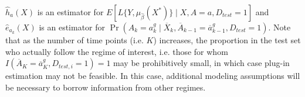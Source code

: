 $\widehat{h}_a(X)$ is an estimator for $E[L\{Y, \mu_{\widehat{\beta}}(X^*)\}\mid X,A = a, D_{test} = 1]$ and $\widehat{e}_{a_k}(X)$ is an estimator for $\Pr(A_k = a^g_k \mid \overline{X}_k, \overline{A}_{k-1} = \overline{a}^g_{k-1}, D_{test} = 1)$. Note that as the number of time points (i.e. $K$) increases, the proportion in the test set who actually follow the regime of interest, i.e. those for whom $I(\overline{A}_K = \overline{a}^g_K, D_{test,i} = 1)=1$ may be prohibitively small, in which case plug-in estimation may not be feasible. In this case, additional modeling assumptions will be necessary to borrow information from other regimes.
\newpage




